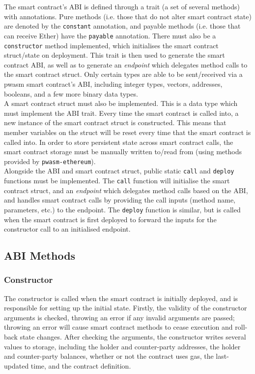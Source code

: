 The smart contract's ABI is defined through a trait (a set of several methods) with annotations. Pure methods (i.e. those that do not alter smart contract state) are denoted by the \texttt{constant} annotation, and payable methods (i.e. those that can receive Ether) have the \texttt{payable} annotation. There must also be a \texttt{constructor} method implemented, which initialises the smart contract struct/state on deployment. This trait is then used to generate the smart contract ABI, as well as to generate an \textit{endpoint} which delegates method calls to the smart contract struct. Only certain types are able to be sent/received via a pwasm smart contract's ABI, including integer types, vectors, addresses, booleans, and a few more binary data types. \\

A smart contract struct must also be implemented. This is a data type which must implement the ABI trait. Every time the smart contract is called into, a new instance of the smart contract struct is constructed. This means that member variables on the struct will be reset every time that the smart contract is called into. In order to store persistent state across smart contract calls, the smart contract storage must be manually written to/read from (using methods provided by \texttt{pwasm-ethereum}). \\

Alongside the ABI and smart contract struct, public static \texttt{call} and \texttt{deploy} functions must be implemented. The \texttt{call} function will initialise the smart contract struct, and an \textit{endpoint} which delegates method calls based on the ABI, and handles smart contract calls by providing the call inputs (method name, parameters, etc.) to the endpoint. The \texttt{deploy} function is similar, but is called when the smart contract is first deployed to forward the inputs for the constructor call to an initialised endpoint.


\subsection{ABI Methods}

\subsubsection{Constructor}

The constructor is called when the smart contract is initially deployed, and is responsible for setting up the initial state. Firstly, the validity of the constructor arguments is checked, throwing an error if any invalid arguments are passed; throwing an error will cause smart contract methods to cease execution and roll-back state changes. After checking the arguments, the constructor writes several values to storage, including the holder and counter-party addresses, the holder and counter-party balances, whether or not the contract uses gas, the last-updated time, and the contract definition. \\

